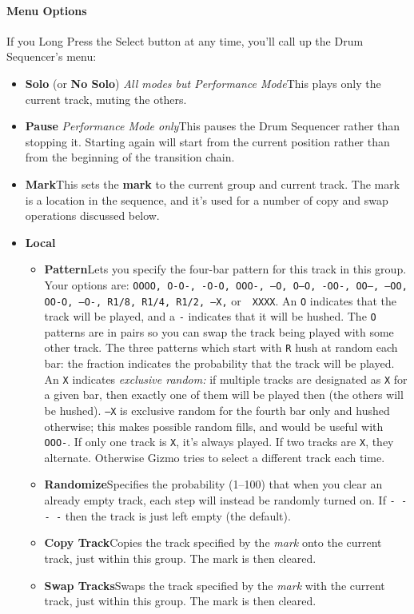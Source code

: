 \documentclass{article}
\begin{document}
\enlargethispage{1em}


\paragraph{Menu Options}

If you Long Press the Select button at any time, you'll call up the Drum Sequencer's menu:%

\begin{itemize}
\item {\bf Solo} (or {\bf No Solo}) {\it All modes but Performance Mode}\quad This plays only the current track, muting the others.
\item {\bf Pause} {\it Performance Mode only}\quad This pauses the Drum Sequencer rather than stopping it.  Starting again will start from the current position rather than from the beginning of the transition chain.
\item {\bf Mark}\quad This sets the {\bf mark} to the current group and current track.  The mark is a location in the sequence, and it's used for a number of copy and swap operations discussed below.

\item {\bf Local}
\begin{itemize}
\item {\bf Pattern}\quad Lets you specify the four-bar pattern for this track in this group.  Your options are: \texttt{OOOO, O-O-, -O-O, OOO-, ---O, O--O, -OO-, OO--, --OO, OO-O, --O-, R1/8, R1/4, R1/2, ---X,} or\ \ {\tt XXXX}.  An {\tt O} indicates that the track will be played, and a {\tt -} indicates that it will be hushed.  The {\tt O} patterns are in pairs so you can swap the track being played with some other track.  The three patterns which start with {\tt R} hush at random each bar: the fraction indicates the probability that the track will be played.  An {\tt X} indicates {\it exclusive random:} if multiple tracks are designated as {\tt X} for a given bar, then exactly one of them will be played then (the others will be hushed).   {\tt ---X} is exclusive random for the fourth bar only and hushed otherwise; this makes possible random fills, and would be useful with {\tt OOO-}.  If only one track is {\tt X}, it's always played.  If two tracks are {\tt X}, they alternate.  Otherwise Gizmo tries to select a different track each time. 
\item {\bf Randomize}\quad Specifies the probability (1--100) that when you clear an already empty track, each step will instead be randomly turned on.  If \texttt{- - - -}  then the track is just left empty (the default).
\item {\bf Copy Track}\quad Copies the track specified by the {\it mark} onto the current track,  just within this group.  The mark is then cleared.
\item {\bf Swap Tracks}\quad Swaps the track specified by the {\it mark} with the current track, just within this group.  The mark is then cleared.
\end{itemize}


\end{itemize}
\end{document}
